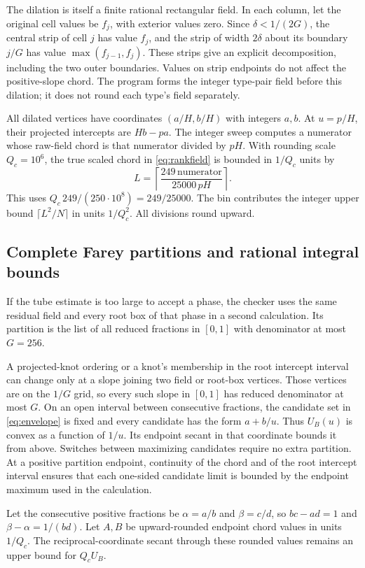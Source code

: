 The dilation is itself a finite rational rectangular field. In each
column, let the original cell values be \(f_j\), with exterior values
zero. Since \(\delta<1/(2G)\), the central strip of cell \(j\)
has value \(f_j\), and the strip of width \(2\delta\) about its
boundary \(j/G\) has value \(\max(f_{j-1},f_j)\). These strips
give an explicit decomposition, including the two outer boundaries.
Values on strip endpoints do not affect the positive-slope chord.
The program forms the integer type-pair field before this dilation;
it does not round each type's field separately.

All dilated vertices have coordinates \((a/H,b/H)\) with integers
\(a,b\). At \(u=p/H\), their projected intercepts are \(Hb-pa\).
The integer sweep computes a numerator whose raw-field chord is
that numerator divided by \(pH\). With rounding scale
\(Q_c=10^6\), the true scaled chord in \eqref{eq:rankfield} is
bounded in \(1/Q_c\) units by
\[
 L=\left\lceil\frac{249\,\text{numerator}}{25000\,pH}\right\rceil.
\]
This uses \(Q_c\,249/(250\cdot10^8)=249/25000\).
The bin contributes the integer upper bound \(\lceil L^2/N\rceil\)
in units \(1/Q_c^2\). All divisions round upward.

\subsection{Complete Farey partitions and rational integral bounds}
If the tube estimate is too large to accept a phase, the checker
uses the same residual field and every root box of that phase in a
second calculation. Its partition is the list of all reduced fractions
in \([0,1]\) with denominator at most \(G=256\).

A projected-knot ordering or a knot's membership in the root intercept
interval can change only at a slope joining two field or root-box
vertices. Those vertices are on the \(1/G\) grid, so every such slope
in \([0,1]\) has reduced denominator at most \(G\). On an open
interval between consecutive fractions, the candidate set in
\eqref{eq:envelope} is fixed and every candidate has the form
\(a+b/u\). Thus \(U_B(u)\) is convex as a function of \(1/u\).
Its endpoint secant in that coordinate bounds it from above.
Switches between maximizing candidates require no extra partition.
At a positive partition endpoint, continuity of the chord and of the
root intercept interval ensures that each one-sided candidate limit
is bounded by the endpoint maximum used in the calculation.

Let the consecutive positive fractions be \(\alpha=a/b\) and
\(\beta=c/d\), so \(bc-ad=1\) and \(\beta-\alpha=1/(bd)\).
Let \(A,B\) be upward-rounded endpoint chord values in units
\(1/Q_c\). The reciprocal-coordinate secant through these rounded
values remains an upper bound for \(Q_c U_B\).

